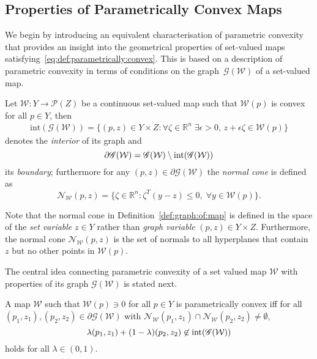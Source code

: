 \documentclass[smallextended]{svjour3}       %
\numberwithin{equation}{section}
\begin{document}
\subsection{Properties of Parametrically Convex Maps}\label{ssec:properties:of:p:convex:maps}
%
We begin by introducing an equivalent characterisation of parametric convexity that provides an insight into the geometrical properties of 
set-valued maps satisfying~\eqref{eq:def:parametrically:convex}.
%
This is based on a description of parametric convexity in terms of conditions on the graph~$\mathscr G(\mathcal W)$ of a set-valued map.
%
\begin{definition}\label{def:graph:of:map}
Let $\mathcal W:Y\rightarrow \mathscr P(Z)$ be a continuous set-valued map
such that $\mathcal W(p)$ is convex for all $p\in Y$, then 
%
\begin{equation*}\begin{aligned}
\text{int}(\mathscr G(\mathcal W)) = \{(p,z) \in Y\times Z : \forall \zeta\in\mathbb R^n\;\exists \epsilon>0, \, z+\epsilon \zeta\in \mathcal W(p) \}
\end{aligned}\end{equation*}
%
denotes the \emph{interior} of its graph and
%
\[
  \partial \mathscr G(\mathcal W) = \mathscr G(\mathcal W)\setminus \textup{int}(\mathscr G(\mathcal W))
\]
%
its \emph{boundary};
%
furthermore for any $(p,z)\in\partial\mathscr G(\mathcal W)$ the \emph{normal cone} is defined as 
%
\[
  \mathcal N_{\mathcal W} (p,z) = \{\zeta \in\mathbb R^n: \zeta^T (y - z) \leq 0, \;  \forall y\in \mathcal W(p) \} .
\]
%
\end{definition}
%
\begin{remark}
%
Note that the normal cone in Definition~\ref{def:graph:of:map} is defined in the space of the \emph{set variable} $z\in Y$ rather than \emph{graph variable} $(p,z)\in Y\times Z$.
%
Furthermore, the normal cone $\mathcal N_{\mathcal W} (p,z)$ is the set of normals to all hyperplanes that contain $z$ but no other points in $\mathcal W(p)$.
%
\end{remark}
%
The central idea connecting parametric convexity of a set valued map $\mathcal W$ with properties of its graph $\mathscr G(\mathcal W)$ is stated next.
%
\begin{theorem}\label{thm:p:convexity:graph}
  A map $\mathcal W$ such that $\mathcal W(p)\ni 0$ for all $p\in Y$
  is parametrically convex iff for all $(p_1,z_1), (p_2,z_2)\in\partial\mathscr G(\mathcal W)$
  with
  $\mathcal N_{\mathcal W}(p_1,z_1)\cap\mathcal N_{\mathcal W}(p_2,z_2)\neq\emptyset$,
%
\begin{equation}\label{eq:graph:def:p:convexity}
\lambda (p_1,z_1) + (1-\lambda) (p_2,z_2) \not\in\textup{int} (\mathscr G(\mathcal W))
\end{equation}
%
holds for all $\lambda\in(0,1)$.
%
\end{theorem}
\end{document}
